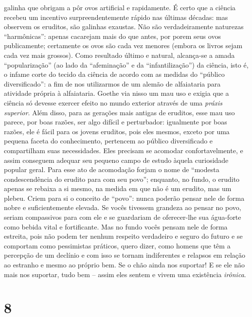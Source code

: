 galinha que obrigam a pôr ovos artificial e rapidamente. É certo que a
ciência recebeu um incentivo surpreendentemente rápido nas últimas
décadas: mas observem os eruditos, são galinhas exaustas. Não são
verdadeiramente naturezas ``harmônicas'': apenas cacarejam mais do que
antes, por porem seus ovos publicamente; certamente os ovos são cada vez
menores (embora os livros sejam cada vez mais grossos). Como resultado
último e natural, alcança-se a amada ``popularização'' (ao lado da
``afeminação'' e da ``infantilização'') da ciência, isto é, o infame
corte do tecido da ciência de acordo com as medidas do ``público
diversificado'': a fim de nos utilizarmos de um alemão de alfaiataria para
atividade própria à alfaiataria. Goethe via nisso um mau uso e exigia
que a ciência só devesse exercer efeito no mundo exterior através de uma
\emph{práxis superior}. Além disso, para as gerações mais antigas de
eruditos, esse mau uso parece, por boas razões, ser algo difícil e
perturbador: igualmente por boas razões, ele é fácil para os jovens
eruditos, pois eles mesmos, exceto por uma pequena faceta do
conhecimento, pertencem ao público diversificado e compartilham suas
necessidades. Eles precisam se acomodar confortavelmente, e assim
conseguem adequar seu pequeno campo de estudo àquela curiosidade popular
geral. Para esse ato de acomodação forjam o nome de ``modesta
condescendência do erudito para com seu povo''; enquanto, no fundo, o
erudito apenas se rebaixa a si mesmo, na medida em que não é um erudito,
mas um plebeu. Criem para si o conceito de ``povo'': nunca poderão
pensar nele de forma nobre e suficientemente elevada. Se vocês tivessem
grandeza ao pensar no povo, seriam compassivos para com ele e se
guardariam de oferecer-lhe sua água-forte como bebida vital e
fortificante. Mas no fundo vocês pensam nele de forma estreita, pois não
podem ter nenhum respeito verdadeiro e seguro do futuro e se comportam
como pessimistas práticos, quero dizer, como homens que têm a percepção
de um declínio e com isso se tornam indiferentes e relapsos em relação
ao estranho e mesmo ao próprio bem. Se o chão ainda nos suportar! E se
ele não mais nos suportar, tudo bem -- assim eles sentem e vivem uma
existência \emph{irônica}.

\chapter{8}\label{capuxedtulo-8}

